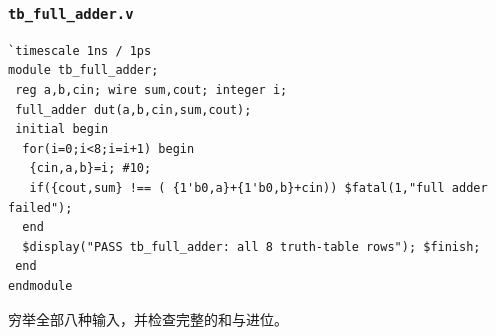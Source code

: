 \documentclass[12pt,a4paper]{ctexart}
\begin{document}
\subsubsection*{\texttt{tb\_full\_adder.v}}
\begin{lstlisting}
`timescale 1ns / 1ps
module tb_full_adder;
 reg a,b,cin; wire sum,cout; integer i;
 full_adder dut(a,b,cin,sum,cout);
 initial begin
  for(i=0;i<8;i=i+1) begin
   {cin,a,b}=i; #10;
   if({cout,sum} !== ( {1'b0,a}+{1'b0,b}+cin)) $fatal(1,"full adder failed");
  end
  $display("PASS tb_full_adder: all 8 truth-table rows"); $finish;
 end
endmodule
\end{lstlisting}
穷举全部八种输入，并检查完整的和与进位。
\end{document}
